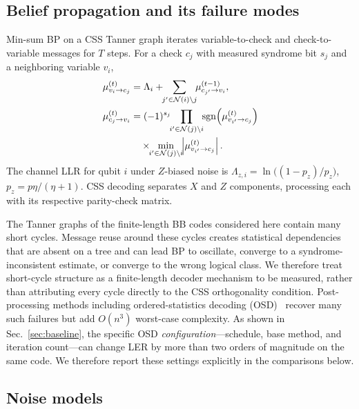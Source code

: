 \documentclass[a4paper,twocolumn,11pt,nopdfoutputerror]{quantumarticle}
\newcommand{\llr}{\Lambda}
\begin{document}
\subsection{Belief propagation and its failure modes}\label{sec:bp}

Min-sum BP on a CSS Tanner graph iterates variable-to-check and
check-to-variable messages for $T$ steps. For a check $c_j$ with measured
syndrome bit $s_j$ and a neighboring variable $v_i$,
\begin{align}
\mu_{v_i \to c_j}^{(t)}
&= \llr_i + \!\!\sum_{j' \in \mathcal{N}(i)\setminus j}\!\!
\mu_{c_{j'} \to v_i}^{(t-1)},
\label{eq:vtc}\\
\mu_{c_j \to v_i}^{(t)}
&= (-1)^{s_j}
\!\!\prod_{i' \in \mathcal{N}(j)\setminus i}\!\!
\mathrm{sgn}\!\left(\mu_{v_{i'}\to c_j}^{(t)}\right) \notag\\
&\quad \times
\!\!\min_{i'\in\mathcal{N}(j)\setminus i}\!\!
\left|\mu_{v_{i'}\to c_j}^{(t)}\right|.
\label{eq:ctv}
\end{align}
The channel LLR for qubit $i$ under $Z$-biased noise is
$\llr_{z,i} = \ln\bigl((1-p_z)/p_z\bigr)$,
$p_z = p\eta/(\eta+1)$.
CSS decoding separates $X$ and $Z$ components, processing each with
its respective parity-check matrix.

The Tanner graphs of the finite-length BB codes considered here contain
many short cycles. Message reuse around these cycles creates statistical
dependencies that are absent on a tree and can lead BP to oscillate,
converge to a syndrome-inconsistent estimate, or converge to the wrong
logical class. We therefore treat short-cycle structure as a finite-length
decoder mechanism to be measured, rather than attributing every cycle
directly to the CSS orthogonality condition. Post-processing methods
including ordered-statistics decoding (OSD)~\cite{Fossorier1995OSD}
recover many such failures but add $O(n^3)$ worst-case complexity.
As shown in Sec.~\ref{sec:baseline}, the specific OSD
\emph{configuration}---schedule, base method, and iteration count---can
change LER by more than two orders of magnitude on the same code. We
therefore report these settings explicitly in the comparisons below.

\subsection{Noise models}\label{sec:noise}
\end{document}
